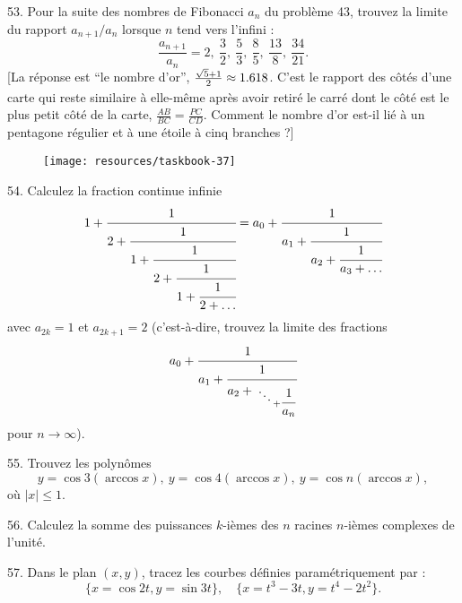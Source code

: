 \begin{problem}{53.}
    Pour la suite des nombres de Fibonacci \( a_n \) du problème 43, trouvez la limite du rapport
    \( a_{n+1}/a_n \) lorsque \( n \) tend vers l'infini :
    \begin{equation*}
        \frac{a_{n+1}}{a_n}=2,\ \frac 32,\ \frac53, \ \frac85, \ \frac{13}8,
        \ \frac{34}{21}.
    \end{equation*}
    [La réponse est \enquote{le nombre d'or},
    \(\frac{\sqrt{5}+1}{2\vphantom)} \approx 1.618\). C'est le rapport des côtés d'une carte qui reste
    similaire à elle-même après avoir retiré le carré dont le côté est le plus petit côté de la carte,
    \(\frac{AB}{BC}=\frac{PC}{CD}\). Comment le nombre d'or est-il lié à un pentagone régulier et à une étoile à cinq branches ?]
    \begin{figure}
        \texttt{[image: resources/taskbook-37]}
    \end{figure}
\end{problem}

\begin{problem}{54.}
    Calculez la fraction continue infinie
    \begin{equation*}
        1+\cfrac{1}{2+\cfrac{1}{1+\cfrac{1}{2+\cfrac{1}{1+\cfrac{1}{2+\ldots}}}}}=
        a_0+\cfrac{1}{a_1+\cfrac{1}{a_2+\cfrac{1}{a_3+\dots}}}
    \end{equation*}
    avec \( a_{2k}=1 \) et \( a_{2k+1}=2 \) (c'est-à-dire, trouvez la limite des fractions
    \begin{equation*}
        a_0+\cfrac{1}{a_1+\cfrac{1}{a_2+{\atop{\ddots \atop {}} + \cfrac{1}{a_n}}}}
    \end{equation*}
    pour \( n \to \infty \)).
\end{problem}

\begin{problem}{55.}
    Trouvez les polynômes
    \begin{equation*}
        y=\cos 3 (\arccos x),\ y=\cos 4 (\arccos x),\
        y=\cos n (\arccos x),
    \end{equation*}
    où \( |x| \leqslant 1 \).
\end{problem}

\begin{problem}{56.}
    Calculez la somme des puissances \( k \)-ièmes des \( n \) racines \( n \)-ièmes complexes de l'unité.
\end{problem}

\begin{problem}{57.}
    Dans le plan $(x, y)$, tracez les courbes définies paramétriquement par :
    \begin{equation*}
        \{x=\cos 2t, y=\sin 3t\},\quad
        \{x=t^3-3t, y=t^4-2t^2\}.
    \end{equation*}
    \vspace{-2\baselineskip}%
\end{problem}

